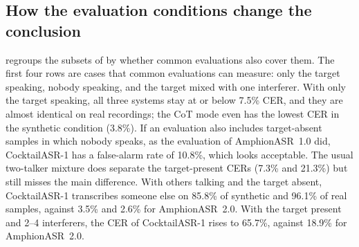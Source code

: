 \subsection{How the evaluation conditions change the conclusion}
\label{subsec:exp_conditions}

 regroups the subsets of \tsbench by whether common evaluations also cover them.
The first four rows are cases that common evaluations can measure: only the target speaking, nobody speaking, and the target mixed with one interferer.
With only the target speaking, all three systems stay at or below 7.5\% CER, and they are almost identical on real recordings; the CoT mode even has the lowest CER in the synthetic condition (3.8\%).
If an evaluation also includes target-absent samples in which nobody speaks, as the evaluation of AmphionASR~1.0 did, CocktailASR-1 has a false-alarm rate of 10.8\%, which looks acceptable.
The usual two-talker mixture does separate the target-present CERs (7.3\% and 21.3\%) but still misses the main difference.
With others talking and the target absent, CocktailASR-1 transcribes someone else on 85.8\% of synthetic and 96.1\% of real samples, against 3.5\% and 2.6\% for AmphionASR~2.0.
With the target present and 2--4 interferers, the CER of CocktailASR-1 rises to 65.7\%, against 18.9\% for AmphionASR~2.0.

